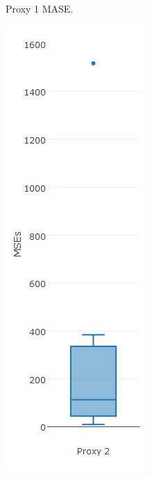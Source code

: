 \begin{figure}[!h]
{\begin{subfigure}{.25\linewidth}
  \caption{Proxy 1 MASE.}
  \label{fig:bp2c}
\end{subfigure}
\begin{subfigure}{.25\linewidth}
  \centering
  \includegraphics[width=\linewidth]{img/6mmaMsebpNaive.png}

\end{subfigure}}
\end{figure}
